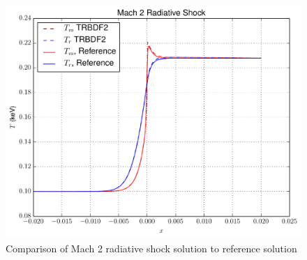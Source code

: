 \begin{figure}[ht]
   \centering
   \includegraphics[width=\textwidth]{figures/mach2_shock_T.pdf}
   \caption{Comparison of Mach 2 radiative shock solution to reference solution}
   \label{fig:mach2_shock_T}
\end{figure}

